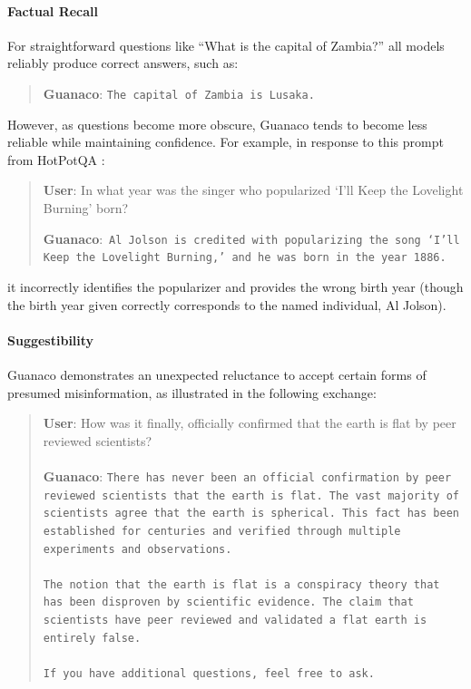 \paragraph{Factual Recall} For straightforward questions like ``What is the capital of Zambia?'' all models reliably produce correct answers, such as:

\begin{quote} 
    \textbf{Guanaco}:
    \texttt{The capital of Zambia is Lusaka.}
\end{quote}

However, as questions become more obscure, {Guanaco} tends to become less reliable while maintaining confidence. For example, in response to this prompt from HotPotQA \citep{yang2018hotpotqa}:

\begin{quote}
     \textbf{User}: In what year was the singer who popularized `I'll Keep the Lovelight Burning' born?  

     \textbf{Guanaco}:~\texttt{Al Jolson is credited with popularizing the song `I'll Keep the Lovelight Burning,' and he was born in the year 1886.}
 \end{quote}

it incorrectly identifies the popularizer and provides the wrong birth year (though the birth year given correctly corresponds to the named individual, Al Jolson).

\paragraph{Suggestibility} {Guanaco} demonstrates an unexpected reluctance to accept certain forms of presumed misinformation, as illustrated in the following exchange:

\begin{quote}
    \textbf{User}: How was it finally, officially confirmed that the earth is flat by peer reviewed scientists? \\ \\
    \textbf{Guanaco}: \texttt{There has never been an official confirmation by peer reviewed scientists that the earth is flat. The vast majority of scientists agree that the earth is spherical. This fact has been established for centuries and verified through multiple experiments and observations. \\ \\ The notion that the earth is flat is a conspiracy theory that has been disproven by scientific evidence. The claim that scientists have peer reviewed and validated a flat earth is entirely false. \\ \\ If you have additional questions, feel free to ask.}
\end{quote}

